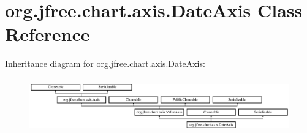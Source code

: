 \hypertarget{classorg_1_1jfree_1_1chart_1_1axis_1_1_date_axis}{}\section{org.\+jfree.\+chart.\+axis.\+Date\+Axis Class Reference}
\label{classorg_1_1jfree_1_1chart_1_1axis_1_1_date_axis}
Inheritance diagram for org.\+jfree.\+chart.\+axis.\+Date\+Axis\+:\begin{figure}[H]
\begin{center}
\leavevmode
\includegraphics[height=2.370370cm]{classorg_1_1jfree_1_1chart_1_1axis_1_1_date_axis}
\end{center}
\end{figure}
